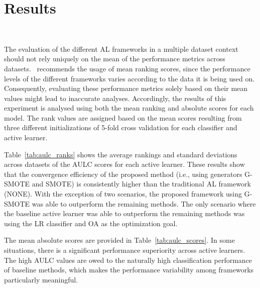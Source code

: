 \documentclass[parskip=full]{scrartcl}
\begin{document}
\section{Results}~\label{sec:results}

The evaluation of the different AL frameworks in a multiple dataset context
should not rely uniquely on the mean of the performance metrics across
datasets.~\cite{demvsar2006} recommends the usage of mean ranking scores,
since the performance levels of the different frameworks varies according to
the data it is being used on. Consequently, evaluating these performance
metrics solely based on their mean values might lead to inaccurate analyses.
Accordingly, the results of this experiment is analysed using both the mean
ranking and absolute scores for each model.  The rank values are assigned
based on the mean scores resulting from three different initializations of
5-fold cross validation for each classifier and active learner.

Table~\ref{tab:aulc_ranks} shows the average rankings and standard deviations
across datasets of the AULC scores for each active learner. These results show
that the convergence efficiency of the proposed method (i.e., using generators
G-SMOTE and SMOTE) is consistently higher than the traditional AL framework
(NONE). With the exception of two scenarios, the proposed framework using
G-SMOTE was able to outperform the remaining methods. The only scenario where
the baseline active learner was able to outperform the remaining methods was
using the LR classifier and OA as the optimization goal. 


The mean absolute scores are provided in Table~\ref{tab:aulc_scores}. In some
situations, there is a significant performance superiority across active
learners. The high AULC values are owed to the naturally high classification
performance of baseline methods, which makes the performance variability among
frameworks particularly meaningful. 

\end{document}
